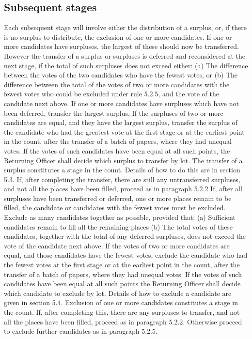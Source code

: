 \subsection{Subsequent stages}
Each subsequent stage will involve either the distribution of a surplus, or, if there is no surplus to distribute, the exclusion of one or more candidates.
 If one or more candidates have surpluses, the largest of these should now be transferred. However the transfer of a surplus or surpluses is deferred and reconsidered at the next stage, if the total of such surpluses does not exceed either:
(a)    The difference between the votes of the two candidates who have the fewest votes, or
(b)    The difference between the total of the votes of two or more candidates with the fewest votes who could be excluded under rule 5.2.5, and the vote of the candidate next above.
If one or more candidates have surpluses which have not been deferred, transfer the largest surplus. If the surpluses of two or more candidates are equal, and they have the largest surplus, transfer the surplus of the candidate who had the greatest vote at the first stage or at the earliest point in the count, after the transfer of a batch of papers, where they had unequal votes. If the votes of such candidates have been equal at all such points, the Returning Officer shall decide which surplus to transfer by lot.
The transfer of a surplus constitutes a stage in the count. Details of how to do this are in section 5.3. If, after completing the transfer, there are still any untransferred surpluses, and not all the places have been filled, proceed as in paragraph 5.2.2
If, after all surpluses have been transferred or deferred, one or more places remain to be filled, the candidate or candidates with the fewest votes must be excluded. Exclude as many candidates together as possible, provided that:
    (a)    Sufficient candidates remain to fill all the remaining places
    (b)    The total votes of these candidates, together with the total of any deferred surpluses, does not exceed the vote of the candidate next above.
If the votes of two or more candidates are equal, and those candidates have the fewest votes, exclude the candidate who had the fewest votes at the first stage or at the earliest point in the count, after the transfer of a batch of papers, where they had unequal votes. If the votes of such candidates have been equal at all such points the Returning Officer shall decide which candidate to exclude by lot.
Details of how to exclude a candidate are given in section 5.4.
Exclusion of one or more candidates constitutes a stage in the count. If, after completing this, there are any surpluses to transfer, and not all the places have been filled, proceed as in paragraph 5.2.2. Otherwise proceed to exclude further candidates as in paragraph 5.2.5.
